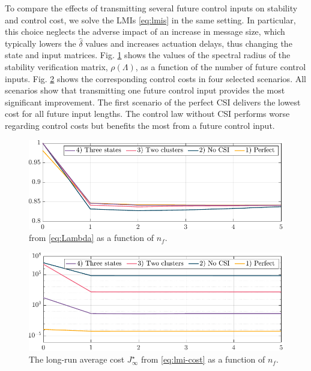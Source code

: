 \documentclass[letterpaper, 10 pt, conference]{ieeeconf}  %
\begin{document}
To compare the effects of transmitting several future control inputs on stability and control cost, we solve the LMIs \eqref{eq:lmis} in the same setting. In particular, this choice neglects the adverse impact of an increase in message size, which typically lowers the $\hat{\delta}$ values and increases actuation delays, thus changing the state and input matrices. Fig. \ref{fig:stability} shows the values of the spectral radius of the stability verification matrix, $\rho(\mathit{\Lambda})$, as a function of the number of future control inputs. Fig. \ref{fig:cost} shows the corresponding control costs in four selected scenarios.
All scenarios show that transmitting one future control input provides the most significant improvement. The first scenario of the perfect CSI delivers the lowest cost for all future input lengths. The control law without CSI performs worse regarding control costs but benefits the most from a future control input.

\begin{figure}
\begin{center}
\vspace{1.8mm}
\includegraphics[width=0.94\columnwidth]{./stability-cntrl-3.pdf}
\caption{\text{\small $\rho(\mathit{\Lambda})$} from \eqref{eq:Lambda} as a function of %
$n_f$.}\label{fig:stability}
\end{center}
\end{figure}
\begin{figure}
\begin{center}
\vspace{-1.5mm}
\includegraphics[width=0.94\columnwidth]{./cost-cntrl-3.pdf}
\caption{The long-run average cost $J_{\infty}^{\star}$ from \eqref{eq:lmi-cost} as a function of %
$n_f$.}\label{fig:cost}
\vspace{-2mm}
\end{center}
\end{figure}
\end{document}
